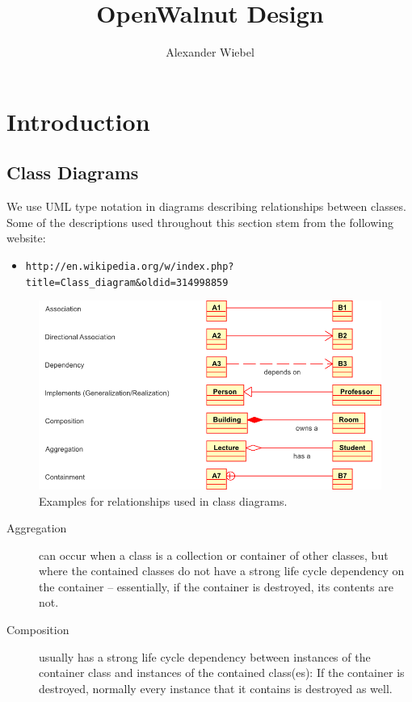 \documentclass[a4paper,12pt]{scrbook}
\begin{document}
\titlehead{
  OpenWalnut Project\\
  www.openwalnut.org}

\subject{Documentation}
\title{
  OpenWalnut Design
}
\author{ Alexander Wiebel }
\publishers{Leipzig}
\maketitle

\tableofcontents

\chapter{Introduction}
\section{Class Diagrams}
We use UML type notation in diagrams describing relationships between classes. Some of the descriptions used throughout this
section stem from the following website:
\begin{itemize}
\item \verb|http://en.wikipedia.org/w/index.php?title=Class_diagram&oldid=314998859|
\end{itemize}


\begin{figure}[htb]
  \includegraphics[width=\textwidth]{relationship_examples}
  \caption{Examples for relationships used in class diagrams.}
\end{figure}


\begin{description}
\item[Aggregation] can occur when a class is a collection or container of other classes, but where the contained classes do not
  have a strong life cycle dependency on the container -- essentially, if the container is destroyed, its contents are not.
\item[Composition] usually has a strong life cycle dependency between instances of the container class and instances of the
  contained class(es): If the container is destroyed, normally every instance that it contains is destroyed as well.
\end{description}
\end{document}
